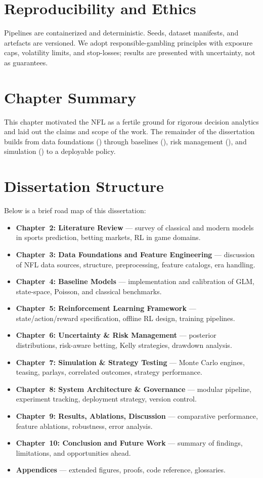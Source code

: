 \section{Reproducibility and Ethics}
Pipelines are containerized and deterministic. Seeds, dataset manifests, and artefacts are versioned. We adopt responsible-gambling principles with exposure caps, volatility limits, and stop-losses; results are presented with uncertainty, not as guarantees.

\section{Chapter Summary}
This chapter motivated the NFL as a fertile ground for rigorous decision analytics and laid out the claims and scope of the work. The remainder of the dissertation builds from data foundations () through baselines (), risk management (), and simulation () to a deployable policy.

\section{Dissertation Structure}

Below is a brief road map of this dissertation:

\begin{itemize}
  \item \textbf{Chapter~2: Literature Review} — survey of classical and modern models in sports prediction, betting markets, RL in game domains.
  \item \textbf{Chapter~3: Data Foundations and Feature Engineering} — discussion of NFL data sources, structure, preprocessing, feature catalogs, era handling.
  \item \textbf{Chapter~4: Baseline Models} — implementation and calibration of GLM, state-space, Poisson, and classical benchmarks.
  \item \textbf{Chapter~5: Reinforcement Learning Framework} — state/action/reward specification, offline RL design, training pipelines.
  \item \textbf{Chapter~6: Uncertainty \& Risk Management} — posterior distributions, risk-aware betting, Kelly strategies, drawdown analysis.
  \item \textbf{Chapter~7: Simulation \& Strategy Testing} — Monte Carlo engines, teasing, parlays, correlated outcomes, strategy performance.
  \item \textbf{Chapter~8: System Architecture \& Governance} — modular pipeline, experiment tracking, deployment strategy, version control.
  \item \textbf{Chapter~9: Results, Ablations, Discussion} — comparative performance, feature ablations, robustness, error analysis.
  \item \textbf{Chapter~10: Conclusion and Future Work} — summary of findings, limitations, and opportunities ahead.
  \item \textbf{Appendices} — extended figures, proofs, code reference, glossaries.
\end{itemize}

